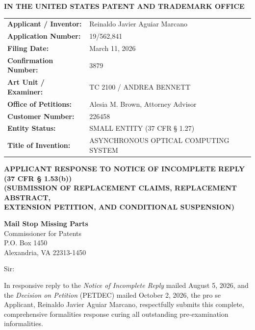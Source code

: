 \documentclass[11pt,letterpaper]{article}
\begin{document}
\thispagestyle{empty}

\begin{center}
    \textbf{\large IN THE UNITED STATES PATENT AND TRADEMARK OFFICE}
\end{center}

\vspace{0.3cm}
\noindent\begin{tabular}{p{2.3in}p{4.0in}}
\textbf{Applicant / Inventor:} & Reinaldo Javier Aguiar Marcano \\
\textbf{Application Number:} & 19/562,841 \\
\textbf{Filing Date:} & March 11, 2026 \\
\textbf{Confirmation Number:} & 3879 \\
\textbf{Art Unit / Examiner:} & TC 2100 / ANDREA BENNETT \\
\textbf{Office of Petitions:} & Alesia M. Brown, Attorney Advisor \\
\textbf{Customer Number:} & 226458 \\
\textbf{Entity Status:} & SMALL ENTITY (37 CFR \S{} 1.27) \\
\textbf{Title of Invention:} & ASYNCHRONOUS OPTICAL COMPUTING SYSTEM \\
\end{tabular}

\vspace{0.4cm}
\begin{center}
    \textbf{\large APPLICANT RESPONSE TO NOTICE OF INCOMPLETE REPLY \\
    (37 CFR \S{} 1.53(b))} \\
    \textbf{\normalsize (SUBMISSION OF REPLACEMENT CLAIMS, REPLACEMENT ABSTRACT, \\
    EXTENSION PETITION, AND CONDITIONAL SUSPENSION)}
\end{center}

\noindent\textbf{Mail Stop Missing Parts} \\
Commissioner for Patents \\
P.O. Box 1450 \\
Alexandria, VA 22313-1450

\vspace{0.2cm}
Sir:

In responsive reply to the \textit{Notice of Incomplete Reply} mailed August 5, 2026, and the \textit{Decision on Petition} (PETDEC) mailed October 2, 2026, the pro se Applicant, Reinaldo Javier Aguiar Marcano, respectfully submits this complete, comprehensive formalities response curing all outstanding pre-examination informalities.
\end{document}
